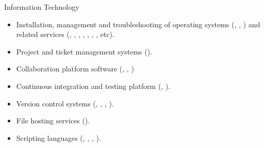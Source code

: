 \vspace{-2.5em}



\begin{cvskills}

\cvskill
{Information Technology}
{
\begin{minipage}{0.48\textwidth}
\vspace{0.3em}
\begin{itemize}[labelwidth=\the\widest,align=right,leftmargin=!,labelsep=1pt,noitemsep]
\item[\custItem] Installation, management and troubleshooting of
operating systems (\textsc{\color{awesome}{Linux/Unix}},
\textsc{\color{awesome}{Windows}}, \textsc{\color{awesome}{MacOS}}) and
related services (\textsc{\color{awesome}{ssh}}, \textsc{\color{awesome}{ftp}},
\textsc{\color{awesome}{nfs}}, \textsc{\color{awesome}{vpn}}, \textsc{\color{awesome}{dhcp}},
\textsc{\color{awesome}{dns}}, \textsc{\color{awesome}{Apache}}, etc).
\item[\custItem] Project and ticket management systems (\textsc{\color{awesome}{Jira}}).
\item[\custItem] Collaboration platform software (\textsc{\color{awesome}{twiki}},
\textsc{\color{awesome}{wiki}}, \textsc{\color{awesome}{Confluence}})
\item[\custItem] Continuous integration and testing platform
(\textsc{\color{awesome}{Bamboo}}, \textsc{\color{awesome}{Jenkins}}).
\item[\custItem] Version control systems (\textsc{\color{awesome}{Git}},
\textsc{\color{awesome}{GitLab}}, \textsc{\color{awesome}{svn}},
\textsc{\color{awesome}{cvs}}).
\item[\custItem] File hosting services (\textsc{\color{awesome}{Nextcloud}}).
\item[\custItem] Scripting languages (\textsc{\color{awesome}{bash}},
\textsc{\color{awesome}{sh}}, \textsc{\color{awesome}{ksh}},
\textsc{\color{awesome}{csh}}).
\end{itemize}
\end{minipage}
}
\end{cvskills}
